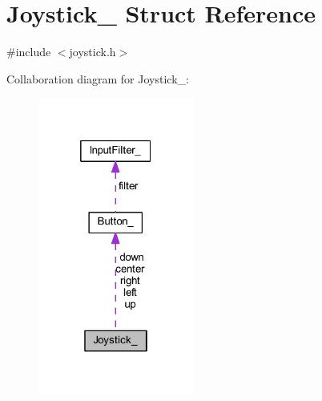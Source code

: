 \hypertarget{struct_joystick__}{}\section{Joystick\+\_\+ Struct Reference}
\label{struct_joystick__}


{\ttfamily \#include $<$joystick.\+h$>$}



Collaboration diagram for Joystick\+\_\+\+:\nopagebreak
\begin{figure}[H]
\begin{center}
\leavevmode
\includegraphics[width=145pt]{struct_joystick____coll__graph}
\end{center}
\end{figure}
